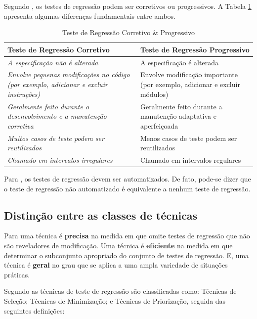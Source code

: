  Segundo , os testes de regressão podem ser corretivos ou progressivos. A Tabela \ref{table:TRCP} apresenta algumas diferenças fundamentais entre ambos.

 
\begin{table}[th]
    \footnotesize
    \centering
    \caption{Teste de Regressão Corretivo \& Progressivo \cite{65194}}
    \label{table:TRCP}
    \def \arraystretch{1.3}
    \begin{tabular}{m{6.5cm}m{6.5cm}}
        \toprule
        \textbf{Teste de Regressão Corretivo} & \textbf{Teste de Regressão Progressivo} \\
        \midrule
        \textit{A especificação não é alterada} & A especificação é alterada\\
        \textit{Envolve pequenas modificações no código (por exemplo, adicionar e excluir instruções)} & Envolve modificação importante (por exemplo, adicionar e excluir módulos)\\ 
        \textit{Geralmente feito durante o desenvolvimento e a manutenção corretiva} & Geralmente feito durante a manutenção adaptativa e aperfeiçoada\\
        \textit{Muitos casos de teste podem ser reutilizados} & Menos casos de teste podem ser reutilizados\\
        \textit{Chamado em intervalos irregulares} & Chamado em intervalos regulares\\
        \bottomrule
    \end{tabular}
\end{table}

Para , os testes de regressão devem ser automatizados. De fato, pode-se dizer que o teste de regressão não automatizado é equivalente a nenhum teste de regressão.


\subsection{Distinção entre as classes de técnicas}
 
Para  uma técnica é \textbf{precisa} na medida em que omite testes de regressão que não são reveladores de modificação. Uma técnica é \textbf{eficiente} na medida em que determinar o subconjunto apropriado do conjunto de testes de regressão. E, uma técnica é \textbf{geral} no grau que se aplica a uma ampla variedade de situações práticas.

Segundo  as técnicas de teste de regressão são classificadas como: Técnicas de Seleção; Técnicas de Minimização; e Técnicas de Priorização, seguida das seguintes definições:
 
